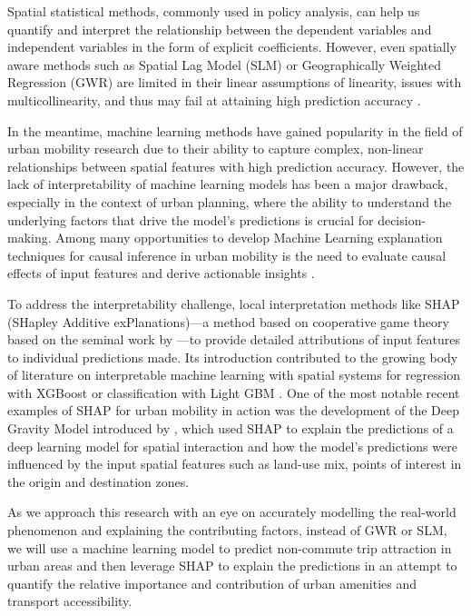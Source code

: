 Spatial statistical methods, commonly used in policy analysis, can help us quantify and interpret the relationship between the dependent variables and independent variables in the form of explicit coefficients. However, even spatially aware methods such as Spatial Lag Model (SLM) or Geographically Weighted Regression (GWR) are limited in their linear assumptions of linearity, issues with multicollinearity, and thus may fail at attaining high prediction accuracy \citep{wheelerMulticollinearityCorrelationLocal2005}.

In the meantime, machine learning methods have gained popularity in the field of urban mobility research due to their ability to capture complex, non-linear relationships between spatial features with high prediction accuracy. However, the lack of interpretability of machine learning models has been a major drawback, especially in the context of urban planning, where the ability to understand the underlying factors that drive the model's predictions is crucial for decision-making. Among many opportunities to develop Machine Learning explanation techniques for causal inference in urban mobility is the need to evaluate causal effects of input features and derive actionable insights \citep{xinVisionPaperCausal2022}.

To address the interpretability challenge, local interpretation methods like SHAP (SHapley Additive exPlanations)---a method based on cooperative game theory based on the seminal work by \cite{lundbergUnifiedApproachInterpreting2017a}---to provide detailed attributions of input features to individual predictions made. Its introduction contributed to the growing body of literature on interpretable machine learning with spatial systems for regression with XGBoost \citep{liExtractingSpatialEffects2022} or classification with Light GBM \citep{louhichiShapleyValuesExplaining2023}. One of the most notable recent examples of SHAP for urban mobility in action was the development of the Deep Gravity Model introduced by \cite{siminiDeepGravityModel2021}, which used SHAP to explain the predictions of a deep learning model for spatial interaction and how the model's predictions were influenced by the input spatial features such as land-use mix, points of interest in the origin and destination zones. 

As we approach this research with an eye on accurately modelling the real-world phenomenon and explaining the contributing factors, instead of GWR or SLM, we will use a machine learning model to predict non-commute trip attraction in urban areas and then leverage SHAP to explain the predictions in an attempt to quantify the relative importance and contribution of urban amenities and transport accessibility.

